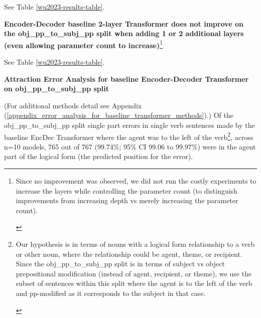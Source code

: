 \documentclass[11pt]{article}
\begin{document}
See Table \ref{wu2023-results-table}.

\textbf{\cite{Wu2023} Encoder-Decoder baseline 2-layer Transformer does not improve on the obj\_pp\_to\_subj\_pp split when adding 1 or 2 additional layers}
\label{wu-baseline-layer-variation-experiment-results}
\textbf{(even allowing parameter count to increase)}\footnote{\begin{footnotesize}
Since no improvement was observed, we did not run the costly experiments to increase the layers while controlling the parameter count (to distinguish improvements from increasing depth vs merely increasing the parameter count).
\end{footnotesize}
}

See Table \ref{wu2023-results-table}.

\textbf{Attraction Error Analysis for \cite{Wu2023} baseline Encoder-Decoder Transformer on obj\_pp\_to\_subj\_pp split}

(For additional methods detail see Appendix (\ref{appendix_error_analysis_for_baseline_transformer_methods}).) Of the obj\_pp\_to\_subj\_pp split single part errors in single verb sentences made by the \cite{Wu2023} baseline EncDec Transformer where the agent was to the left of the verb\footnote{\begin{footnotesize}Our hypothesis is in terms of nouns with a logical form relationship to a verb or other noun, where the relationship could be agent, theme, or recipient.
Since the obj\_pp\_to\_subj\_pp split is in terms of subject vs object prepositional modification (instead of agent, recipient, or theme), we use the subset of sentences within this split where the agent is to the left of the verb and pp-modified as it corresponds to the subject in that case.
\end{footnotesize}
}, 
across n=10 models, 765 out of 767 (99.74\%; 95\% CI 99.06 to 99.97\%) were in the agent part of the logical form (the predicted position for the error).
\end{document}
